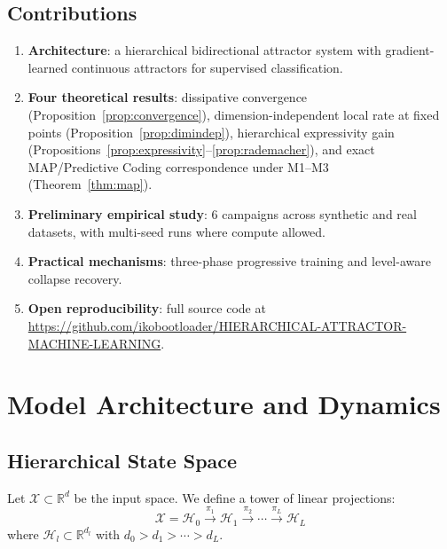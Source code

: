 \documentclass[11pt,a4paper]{article}
\begin{document}
\subsection{Contributions}

\begin{enumerate}
  \item \textbf{Architecture}: a hierarchical bidirectional attractor system with
        gradient-learned continuous attractors for supervised classification.
  \item \textbf{Four theoretical results}: dissipative convergence (Proposition~\ref{prop:convergence}),
        dimension-independent local rate at fixed points (Proposition~\ref{prop:dimindep}),
        hierarchical expressivity gain (Propositions~\ref{prop:expressivity}--\ref{prop:rademacher}),
        and exact MAP/Predictive Coding correspondence under M1--M3 (Theorem~\ref{thm:map}).
  \item \textbf{Preliminary empirical study}: 6 campaigns across synthetic and real
        datasets, with multi-seed runs where compute allowed.
  \item \textbf{Practical mechanisms}: three-phase progressive training and level-aware
        collapse recovery.
  \item \textbf{Open reproducibility}: full source code at
        \url{https://github.com/ikobootloader/HIERARCHICAL-ATTRACTOR-MACHINE-LEARNING}.
\end{enumerate}

\section{Model Architecture and Dynamics}

\subsection{Hierarchical State Space}

Let $\mathcal{X} \subset \mathbb{R}^d$ be the input space. We define a tower of linear
projections:
\begin{equation}
  \mathcal{X} = \mathcal{H}_0
  \xrightarrow{\pi_1} \mathcal{H}_1
  \xrightarrow{\pi_2} \cdots
  \xrightarrow{\pi_L} \mathcal{H}_L
\end{equation}
where $\mathcal{H}_l \subset \mathbb{R}^{d_l}$ with $d_0 > d_1 > \cdots > d_L$.
\end{document}

